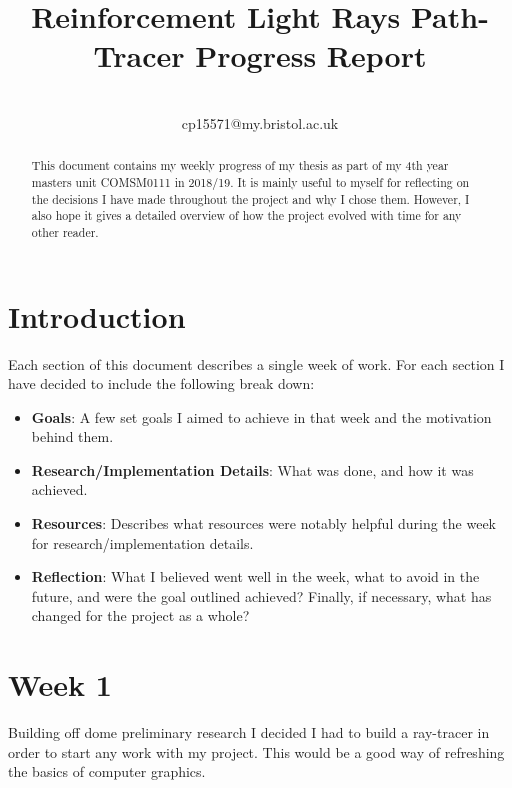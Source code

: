 \documentclass[conference]{IEEEtran}
\begin{document}
\title{Reinforcement Light Rays Path-Tracer Progress Report}

\author{\\ cp15571@my.bristol.ac.uk }

\maketitle

\begin{abstract}
This document contains my weekly progress of my thesis as part of my 4th year masters unit COMSM0111 in 2018/19. It is mainly useful to myself for reflecting on the decisions I have made throughout the project and why I chose them.  However, I also hope it gives a detailed overview of how the project evolved with time for any other reader.
\end{abstract}


\section{Introduction}
Each section of this document describes a single week of work. For each section I have decided to include the following break down:

\begin{itemize}

\item  \textbf{Goals}: A few set goals I aimed to achieve in that week and the motivation behind them.

\item \textbf{Research/Implementation Details}: What was done, and how it was achieved.

\item \textbf{Resources}: Describes what resources were notably helpful during the week for research/implementation details.

\item \textbf{Reflection}: What I believed went well in the week, what to avoid in the future, and were the goal outlined achieved? Finally, if necessary, what has changed for the project as a whole?

\end{itemize}

\section*{Week 1}

Building off dome preliminary research I decided I had to build a ray-tracer in order to start any work with my project. This would be a good way of refreshing the basics of computer graphics.
\end{document}
